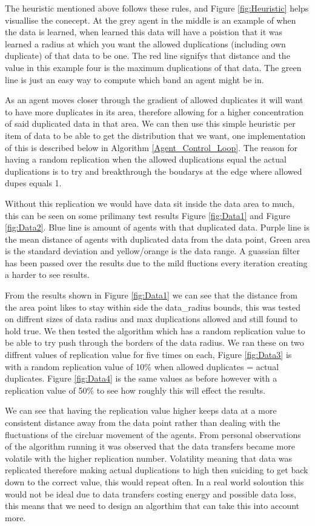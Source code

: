 \documentclass{UoYCSproject}
\begin{document}
The heuristic mentioned above follows these rules, and Figure \ref{fig:Heuristic} helps visuallise the conecept. 
At the grey agent in the middle is an example of when the data is learned, when learned this data will have a poistion that it was learned a radius at which you want the allowed duplications (including own duplicate) of that data to be one.
The red line signifys that distance and the value in this example four is the maximum duplications of that data.
The green line is just an easy way to compute which band an agent might be in.

As an agent moves closer through the gradient of allowed duplicates it will want to have more duplicates in its area, therefore allowing for a higher concentration of said duplicated data in that area.
We can then use this simple heuristic per item of data to be able to get the distribution that we want, one implementation of this is described below in Algorithm \ref{Agent_Control_Loop}.
The reason for having a random replication when the allowed duplications equal the actual duplications is to try and breakthrough the boudarys at the edge where allowed dupes equals 1.

Without this replication we would have data sit inside the data area to much, this can be seen on some prilimany test results Figure \ref{fig:Data1} and Figure \ref{fig:Data2}.
Blue line is amount of agents with that duplicated data.
Purple line is the mean distance of agents with duplicated data from the data point, Green area is the standard deviation and yellow/orange is the data range.
A guassian filter has been passed over the results due to the mild fluctions every iteration creating a harder to see results.

From the results shown in Figure \ref{fig:Data1} we can see that the distance from the area point likes to stay within side the data\_radius bounds, this was tested on diffrent sizes of data radius and max duplications allowed and still found to hold true.
We then tested the algorithm which has a random replication value to be able to try push through the borders of the data radius.
We ran these on two diffrent values of replication value for five times on each, Figure \ref{fig:Data3} is with a random replication value of 10\% when allowed duplicates = actual duplicates.
Figure \ref{fig:Data4} is the same values as before however with a replication value of 50\% to see how roughly this will effect the results.

We can see that having the replication value higher keeps data at a more consistent distance away from the data point rather than dealing with the fluctuations of the circluar movement of the agents.
From personal observations of the algorithm running it was observed that the data transfers became more volatile with the higher replication number.
Volatility meaning that data was replicated therefore making actual duplications to high then suiciding to get back down to the correct value, this would repeat often.
In a real world soloution this would not be ideal due to data transfers costing energy and possible data loss, this means that we need to design an algorthim that can take this into account more.
\end{document}
